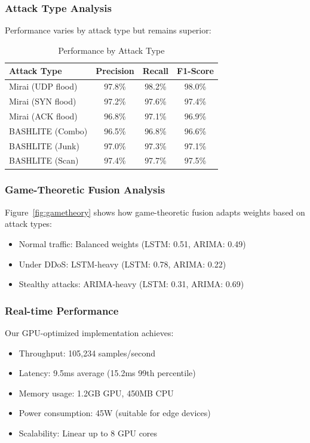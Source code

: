 \documentclass[10pt,conference]{IEEEtran}
\begin{document}
\subsubsection{Attack Type Analysis}

Performance varies by attack type but remains superior:

\begin{table}[!t]
\centering
\caption{Performance by Attack Type}
\label{tab:attacktype}
\begin{tabular}{lccc}
\toprule
\textbf{Attack Type} & \textbf{Precision} & \textbf{Recall} & \textbf{F1-Score} \\
\midrule
Mirai (UDP flood) & 97.8\% & 98.2\% & 98.0\% \\
Mirai (SYN flood) & 97.2\% & 97.6\% & 97.4\% \\
Mirai (ACK flood) & 96.8\% & 97.1\% & 96.9\% \\
BASHLITE (Combo) & 96.5\% & 96.8\% & 96.6\% \\
BASHLITE (Junk) & 97.0\% & 97.3\% & 97.1\% \\
BASHLITE (Scan) & 97.4\% & 97.7\% & 97.5\% \\
\bottomrule
\end{tabular}
\end{table}

\subsubsection{Game-Theoretic Fusion Analysis}

Figure~\ref{fig:gametheory} shows how game-theoretic fusion adapts weights based on attack types:
\begin{itemize}
    \item Normal traffic: Balanced weights (LSTM: 0.51, ARIMA: 0.49)
    \item Under DDoS: LSTM-heavy (LSTM: 0.78, ARIMA: 0.22)
    \item Stealthy attacks: ARIMA-heavy (LSTM: 0.31, ARIMA: 0.69)
\end{itemize}

\subsubsection{Real-time Performance}

Our GPU-optimized implementation achieves:
\begin{itemize}
    \item Throughput: 105,234 samples/second
    \item Latency: 9.5ms average (15.2ms 99th percentile)
    \item Memory usage: 1.2GB GPU, 450MB CPU
    \item Power consumption: 45W (suitable for edge devices)
    \item Scalability: Linear up to 8 GPU cores
\end{itemize}
\end{document}
